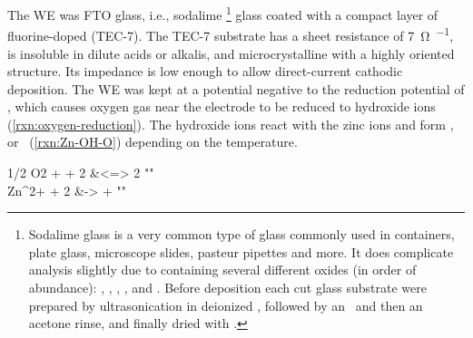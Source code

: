 \documentclass[draft,webedition,openright,titles,swedish,english]{LuaUUThesis}\usepackage[]{graphicx}\usepackage[]{xcolor}
\makeatletter
\newcommand{\ie}{i.e.}
\newenvironment{subreactions}{%
   \refstepcounter{reaction}%
   \protected@edef\theparentequation{\thereaction}%
   \setcounter{parentequation}{\value{reaction}}%
   \setcounter{reaction}{0}%
   \def\thereaction{\theparentequation\alph{reaction}}%
   \ignorespaces
}{%
   \setcounter{reaction}{\value{parentequation}}%
   \ignorespacesafterend
}
\makeatother
\begin{document}
The \gls{WE} was \gls{FTO} glass, \ie, sodalime%
\footnote{%
   Sodalime glass is a very common type of glass commonly used in containers, plate glass,
   microscope slides, pasteur pipettes and more.
   It does complicate analysis slightly due to containing several different oxides (in order of abundance):
   , , , , and .
   Before deposition each cut glass substrate were prepared by ultrasonication
   in deionized \water, followed by an \EtOH\ and then an acetone rinse,
   and finally dried with .
}
glass coated with a compact
layer of fluorine-doped \tinox (TEC-7).
The TEC-7 substrate has a sheet resistance of \qty{7}{\ohm\per\sq},
is insoluble in dilute acids or alkalis,
and microcrystalline with a highly oriented structure.
Its impedance is low enough to allow direct-current cathodic deposition.
The \gls{WE} was kept at a potential negative to the reduction potential
of , which causes oxygen gas near the electrode to be reduced to
hydroxide ions (\cref{rxn:oxygen-reduction}). The hydroxide ions react with the
zinc ions and form ,  or \ZnO\ (\cref{rxn:Zn-OH-O})
depending on the temperature.
\begin{subreactions}\begin{reactions}
1/2 O2 + \water{} + 2 \electron{} &<=> 2 \hydroxide{}  "\label{rxn:oxygen-reduction}" \\
Zn^{2+} + 2 \hydroxide{} &-> \ZnO{} + \water{}  "\label{rxn:Zn-OH-O}"
\end{reactions}\end{subreactions}
\addtocounter{reaction}{-1}
\vspace{-\baselineskip}%
\end{document}
